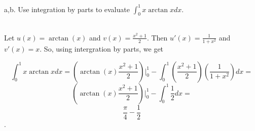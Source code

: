 a,b. Use integration by parts to evaluate $\int_0^1x\arctan xdx$.\\

\begin{solution}\renewcommand{\qedsymbol}{}\ \\
    Let $u(x)=\arctan(x)$ and $v(x)=\frac{x^2+1}{2}$. Then $u'(x)=\frac{1}{1+x^2}$ and $v'(x)=x$. So,
    using intergration by parts, we get
    
    $$\int_0^1x\arctan xdx=(\arctan(x)\frac{x^2+1}{2})|_0^1-
    \int_0^1(\frac{x^2+1}{2})(\frac{1}{1+x^2})dx=$$
    $$(\arctan(x)\frac{x^2+1}{2})|_0^1-\int_0^1\frac12dx=$$ $$\frac{\pi}{4}-\frac12$$.

\end{solution}